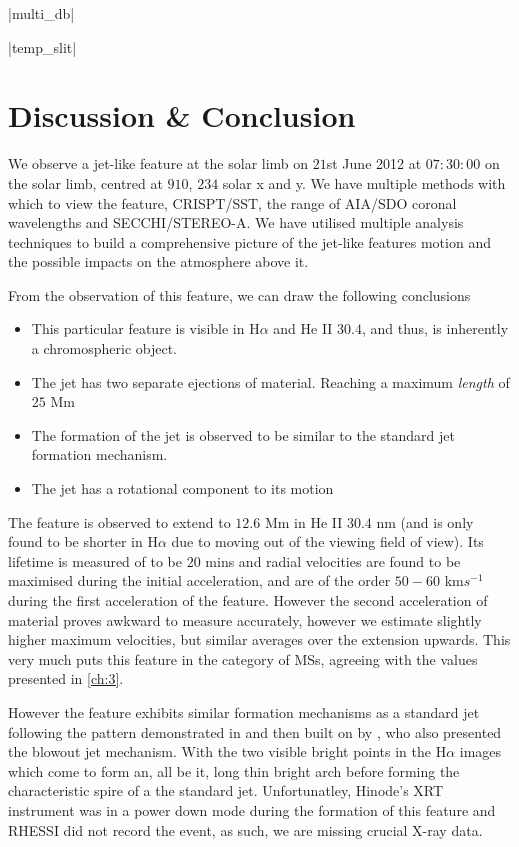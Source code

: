 \py[chapter5]|multi_db|

\py[chapter5]|temp_slit|

\section{Discussion \& Conclusion}
\label{sec:DandC}

We observe a jet-like feature at the solar limb on $21$st June 2012 at $07:30:00$ on the solar limb, centred at $910$, $234$ solar x and y.
We have multiple methods with which to view the feature, CRISPT/SST, the range of AIA/SDO coronal wavelengths and SECCHI/STEREO-A.
We have utilised multiple analysis techniques to build a comprehensive picture of the jet-like features motion and the possible impacts on the atmosphere above it.

From the observation of this feature, we can draw the following conclusions
\begin{itemize}
	\item{This particular feature is visible in H$\alpha$ and He II $30.4$, and thus, is inherently a chromospheric object.}
	\item{The jet has two separate ejections of material. Reaching a maximum \emph{length} of $25$ Mm}
	\item{The formation of the jet is observed to be similar to the standard jet formation mechanism.}
	\item{The jet has a rotational component to its motion}
\end{itemize}

The feature is observed to extend to $12.6$ Mm in He II $30.4$ nm (and is only found to be shorter in H$\alpha$ due to moving out of the viewing field of view).
Its lifetime is measured of to be $20$ mins and radial velocities are found to be maximised during the initial acceleration, and are of the order $50 - 60$ km$s^{-1}$ during the first acceleration of the feature.
However the second acceleration of material proves awkward to measure accurately, however we estimate slightly higher maximum velocities, but similar averages over the extension upwards. 
This very much puts this feature in the category of MSs, agreeing with the values presented in \cref{ch:3}.

However the feature exhibits similar formation mechanisms as a standard jet following the pattern demonstrated in \cite{Shibata1992} and then built on by \cite{Moore2010}, who also presented the blowout jet mechanism.
With the two visible bright points in the H$\alpha$ images which come to form an, all be it, long thin bright arch before forming the characteristic spire of a the standard jet.
Unfortunatley, Hinode's XRT instrument was in a power down mode during the formation of this feature and RHESSI did not record the event, as such, we are missing crucial X-ray data.

